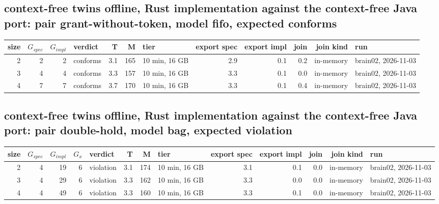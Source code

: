 \documentclass[10pt]{article}
\begin{document}
\subsection*{context-free twins offline, Rust implementation against the context-free Java port: pair \textsf{grant-without-token}, model fifo, expected conforms}
\begin{longtable}{@{}rrrlrrlrrrrl@{}}
\toprule
size & $G_{\mathit{spec}}$ & $G_{\mathit{impl}}$ & verdict & T & M & tier & export spec & export impl & join & join kind & run \\
\midrule
\endhead
\color{red} 2 & 2 & 2 & conforms & 3.1 & 165 & 10 min, 16 GB & 2.9 & 0.1 & 0.2 & in-memory & brain02, 2026-11-03 \\
\color{red} 3 & 4 & 4 & conforms & 3.3 & 157 & 10 min, 16 GB & 3.3 & 0.1 & 0.0 & in-memory & brain02, 2026-11-03 \\
\color{red} 4 & 7 & 7 & conforms & 3.7 & 170 & 10 min, 16 GB & 3.3 & 0.1 & 0.4 & in-memory & brain02, 2026-11-03 \\
\bottomrule
\end{longtable}
\subsection*{context-free twins offline, Rust implementation against the context-free Java port: pair \textsf{double-hold}, model bag, expected violation}
\begin{longtable}{@{}rrrrlrrlrrrrl@{}}
\toprule
size & $G_{\mathit{spec}}$ & $G_{\mathit{impl}}$ & $G_x$ & verdict & T & M & tier & export spec & export impl & join & join kind & run \\
\midrule
\endhead
\color{red} 2 & 4 & 19 & 6 & violation & 3.1 & 174 & 10 min, 16 GB & 3.1 & 0.1 & 0.0 & in-memory & brain02, 2026-11-03 \\
\color{red} 3 & 4 & 29 & 6 & violation & 3.3 & 162 & 10 min, 16 GB & 3.3 & 0.0 & 0.0 & in-memory & brain02, 2026-11-03 \\
\color{red} 4 & 4 & 49 & 6 & violation & 3.3 & 160 & 10 min, 16 GB & 3.3 & 0.1 & 0.0 & in-memory & brain02, 2026-11-03 \\
\bottomrule
\end{longtable}
\end{document}
